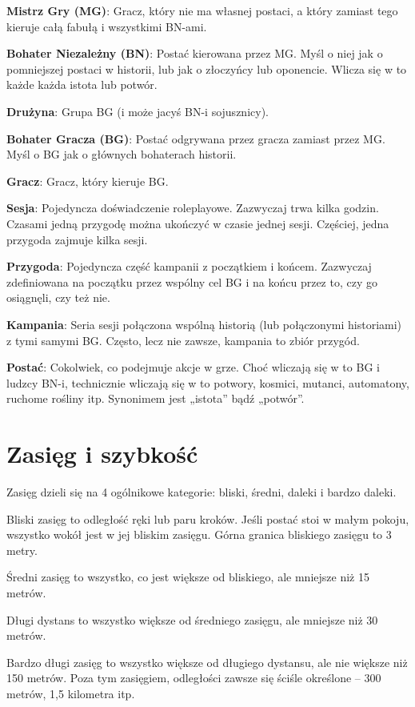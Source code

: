 {\bfseries Mistrz Gry (MG)}: Gracz, który nie ma własnej postaci, a który zamiast tego kieruje całą fabułą i wszystkimi BN-ami.

{\bfseries Bohater Niezależny (BN)}: Postać kierowana przez MG. Myśl o niej jak o pomniejszej postaci w historii, lub jak o złoczyńcy lub oponencie. Wlicza się w to każde każda istota lub potwór.

{\bfseries Drużyna}: Grupa BG (i może jacyś BN-i sojusznicy).

{\bfseries Bohater Gracza (BG)}: Postać odgrywana przez gracza zamiast przez MG. Myśl o BG jak o głównych bohaterach historii.

{\bfseries Gracz}: Gracz, który kieruje BG.

{\bfseries Sesja}: Pojedyncza doświadczenie roleplayowe. Zazwyczaj trwa kilka godzin. Czasami jedną przygodę można ukończyć w czasie jednej sesji. Częściej, jedna przygoda zajmuje kilka sesji.

{\bfseries Przygoda}: Pojedyncza część kampanii z początkiem i końcem. Zazwyczaj zdefiniowana na początku przez wspólny cel BG i na końcu przez to, czy go osiągnęli, czy też nie. 

{\bfseries Kampania}: Seria sesji połączona wspólną historią (lub połączonymi historiami) z tymi samymi BG. Często, lecz nie zawsze, kampania to zbiór przygód.

{\bfseries Postać}: Cokolwiek, co podejmuje akcje w grze. Choć wliczają się w to BG i ludzcy BN-i, technicznie wliczają się w to potwory, kosmici, mutanci, automatony, ruchome rośliny itp. Synonimem jest „istota” bądź „potwór”.

\section {Zasięg i szybkość}

Zasięg dzieli się na 4 ogólnikowe kategorie: bliski, średni, daleki i bardzo daleki.

Bliski zasięg to odległość ręki lub paru kroków. Jeśli postać stoi w małym pokoju, wszystko wokół jest w jej bliskim zasięgu. Górna granica bliskiego zasięgu to 3 metry.

Średni zasięg to wszystko, co jest większe od bliskiego, ale mniejsze niż 15 metrów.

Długi dystans to wszystko większe od średniego zasięgu, ale mniejsze niż 30 metrów.

Bardzo długi zasięg to wszystko większe od długiego dystansu, ale nie większe niż 150 metrów. Poza tym zasięgiem, odległości zawsze się ściśle określone – 300 metrów, 1,5 kilometra itp.

